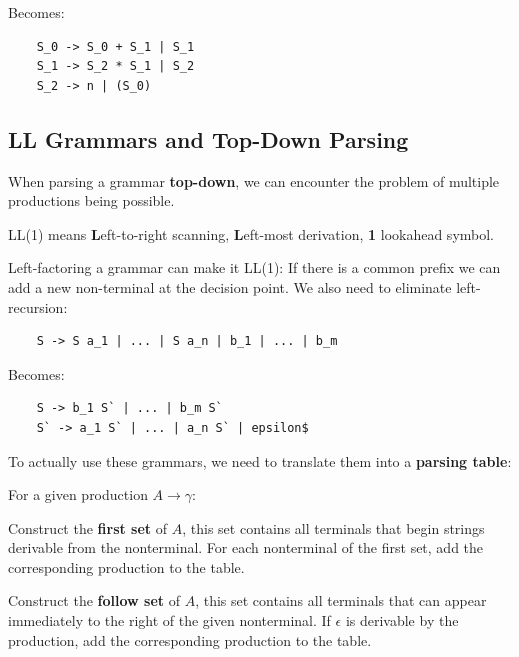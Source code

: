 Becomes:\smallskip

\begin{lstlisting}
	S_0 -> S_0 + S_1 | S_1
	S_1 -> S_2 * S_1 | S_2
	S_2 -> n | (S_0)
\end{lstlisting}


\subsection*{LL Grammars and Top-Down Parsing}

When parsing a grammar \textbf{top-down}, we can encounter the problem of multiple productions being possible. \medskip
		
LL(1) means \textbf{L}eft-to-right scanning, \textbf{L}eft-most derivation, \textbf{1} lookahead symbol. \medskip
		
Left-factoring a grammar can make it LL(1): If there is a common prefix we can add a new non-terminal at the decision point. We also need to eliminate left-recursion:\smallskip

\begin{lstlisting}
 	S -> S a_1 | ... | S a_n | b_1 | ... | b_m
\end{lstlisting}\smallskip

Becomes:\smallskip

\begin{lstlisting}		
	S -> b_1 S` | ... | b_m S`		
	S` -> a_1 S` | ... | a_n S` | epsilon$
\end{lstlisting}\medskip

To actually use these grammars, we need to translate them into a \textbf{parsing table}: \medskip

For a given production $A \to \gamma$:
\begin{compactitem}
	\item Construct the \textbf{first set} of $A$, this set contains all terminals that begin strings derivable from the nonterminal. For each nonterminal of the first set, add the corresponding production to the table.
	
	\item Construct the \textbf{follow set} of $A$, this set contains all terminals that can appear immediately to the right of the given nonterminal. If $\epsilon$ is derivable by the production, add the corresponding production to the table.
\end{compactitem}

